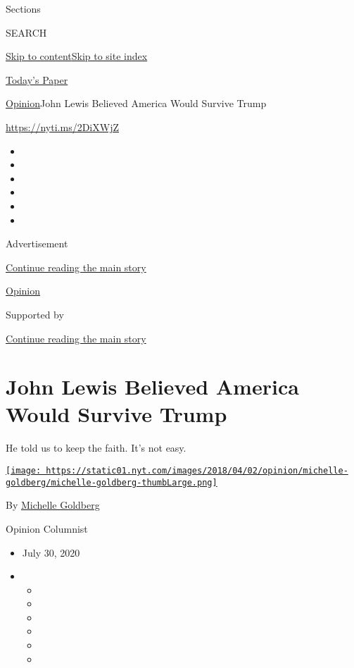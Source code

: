 Sections

SEARCH

\protect\hyperlink{site-content}{Skip to
content}\protect\hyperlink{site-index}{Skip to site index}

\href{https://myaccount.nytimes.com/auth/login?response_type=cookie\&client_id=vi}{}

\href{https://www.nytimes.com/section/todayspaper}{Today's Paper}

\href{/section/opinion}{Opinion}\textbar{}John Lewis Believed America
Would Survive Trump

\href{https://nyti.ms/2DiXWjZ}{https://nyti.ms/2DiXWjZ}

\begin{itemize}
\item
\item
\item
\item
\item
\item
\end{itemize}

Advertisement

\protect\hyperlink{after-top}{Continue reading the main story}

\href{/section/opinion}{Opinion}

Supported by

\protect\hyperlink{after-sponsor}{Continue reading the main story}

\hypertarget{john-lewis-believed-america-would-survive-trump}{%
\section{John Lewis Believed America Would Survive
Trump}\label{john-lewis-believed-america-would-survive-trump}}

He told us to keep the faith. It's not easy.

\href{https://www.nytimes.com/by/michelle-goldberg}{\texttt{[image: https://static01.nyt.com/images/2018/04/02/opinion/michelle-goldberg/michelle-goldberg-thumbLarge.png]}}

By \href{https://www.nytimes.com/by/michelle-goldberg}{Michelle
Goldberg}

Opinion Columnist

\begin{itemize}
\item
  July 30, 2020
\item
  \begin{itemize}
  \item
  \item
  \item
  \item
  \item
  \item
  \end{itemize}
\end{itemize}

